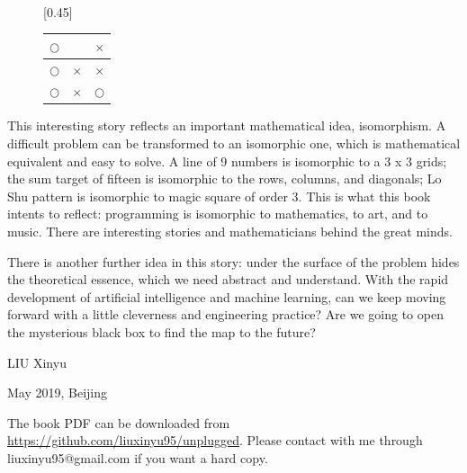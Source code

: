 \documentclass[UTF8]{article}
\begin{document}
\begin{figure}[htbp]
{\begin{tabular}{c|c|c}
   \end{tabular}
   \vspace{3mm}
 } \vspace{3mm} \\
 [0.45\linewidth]{
   \begin{tabular}{c|c|c}
   $\pmb{\bigcirc}$ &  & $\times$\\
   \hline
   $\pmb{\bigcirc}$ &  $\times$ & $\times$ \\
   \hline
   $\pmb{\bigcirc}$ & $\times$ & $\bigcirc$ \\
   \end{tabular}
   \vspace{3mm}
 }
 \captionsetup{labelformat=empty}
 \caption{}
 \label{fig:game-steps}
\end{figure}

This interesting story reflects an important mathematical idea, isomorphism. A difficult problem can be transformed to an isomorphic one, which is mathematical equivalent and easy to solve. A line of 9 numbers is isomorphic to a 3 x 3 grids; the sum target of fifteen is isomorphic to the rows, columns, and diagonals; Lo Shu pattern is isomorphic to magic square of order 3. This is what this book intents to reflect: programming is isomorphic to mathematics, to art, and to music. There are interesting stories and mathematicians behind the great minds.

There is another further idea in this story: under the surface of the problem hides the theoretical essence, which we need abstract and understand. With the rapid development of artificial intelligence and machine learning, can we keep moving forward with a little cleverness and engineering practice? Are we going to open the mysterious black box to find the map to the future?

\vspace{15mm}

LIU Xinyu

May 2019, Beijing

\begin{Exercise}
\end{Exercise}

\vspace{10mm}

The book PDF can be downloaded from \url{https://github.com/liuxinyu95/unplugged}. Please contact with me through liuxinyu95@gmail.com if you want a hard copy.

\ifx\wholebook\relax \else

\expandafter\enddocument

\fi
\end{document}

